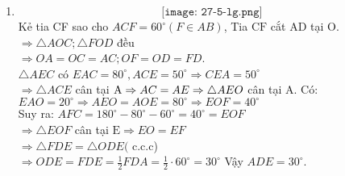 \begin{bt}
{\begin{enumerate}
        \item 
        $$\texttt{[image: 27-5-lg.png]}$$        
        Kẻ tia CF sao cho $A C F=60^{\circ}(F \in A B)$,
        Tia $\mathrm{CF}$ cắt $\mathrm{AD}$ tại $\mathrm{O}$.\\[5px]
        $\Rightarrow \triangle A O C ; \triangle F O D$ đều\\[5px] $\Rightarrow O A=O C=A C ; O F=O D=F D$.\\[5px]
        $\triangle A E C$ có $E A C=80^{\circ}, A C E=50^{\circ} \Rightarrow C E A=50^{\circ}$\\[5px]
        $\Rightarrow \triangle A C E$ cân tại $\mathrm{A}\\[5px] \Rightarrow A C=A E \Rightarrow \triangle A E O$ cân tại $\mathrm{A}$. Có:\\[5px]
        $E A O=20^{\circ} \Rightarrow A E O=A O E=80^{\circ} \Rightarrow E O F=40^{\circ}$\\[5px]
        Suy ra: $A F C=180^{\circ}-80^{\circ}-60^{\circ}=40^{\circ}=E O F$\\[5px]
        $\Rightarrow \triangle E O F$ cân tại $\mathrm{E} \Rightarrow E O=E F$\\[5px]
        $\Rightarrow \triangle F D E=\triangle O D E($ c.c.c)\\[5px]
        $\Rightarrow O D E=F D E=\frac{1}{2} F D A=\frac{1}{2} \cdot 60^{\circ}=30^{\circ}$ Vậy $A D E=30^{\circ}$.
    \end{enumerate}
}
\end{bt}


